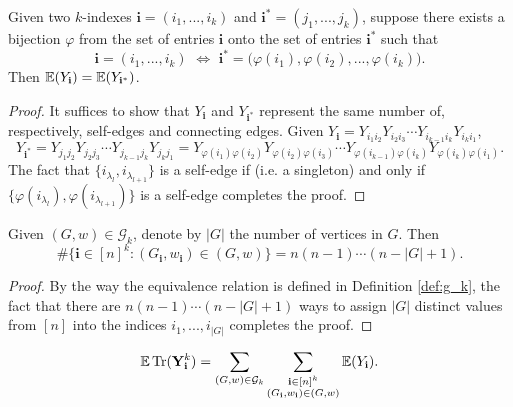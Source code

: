 \begin{lemma}
  \label{lem:equal_equiv_class_equal_expectation}
  \notready
  \uses{}
  Given two $k$-indexes $\mathbf{i} = (i_1,...,i_k)$ and $\mathbf{i}^* = (j_1,...,j_k)$, 
  suppose there exists a bijection $\varphi$ from the set of entries $\mathbf{i}$ onto the set of entries $\mathbf{i}^*$ such that
  \[
  \mathbf{i} = (i_1,...,i_k) \,\, \Longleftrightarrow \,\, \mathbf{i}^* = \bigl( \varphi(i_1),\varphi(i_2),...,\varphi(i_k) \bigl).
  \]
  Then ${\mathbb{E}} (Y_\mathbf{i}) = {\mathbb{E}} (Y_{\mathbf{i}^*})$.
\end{lemma}
\begin{proof}
  It suffices to show that $Y_\mathbf{i}$ and $Y_{\mathbf{i}^*}$ represent the same number of, respectively, self-edges and connecting edges.
  Given $Y_\mathbf{i} = Y_{i_1 i_2}Y_{i_2 i_3} \cdots Y_{i_{k-1} i_k}Y_{i_k i_1}$,
  \[
  Y_{\mathbf{i}^*} = Y_{j_1 j_2}Y_{j_2 j_3} \cdots Y_{j_{k-1} j_k}Y_{j_k j_1} 
  = Y_{\varphi(i_1) \varphi(i_2)}Y_{\varphi(i_2) \varphi(i_3)} \cdots Y_{\varphi(i_{k-1}) \varphi(i_k)}Y_{\varphi(i_k) \varphi(i_1)}.
  \] 
  The fact that $\{ i_{\lambda_l},i_{\lambda_{l+1}} \}$ is a self-edge 
  if (i.e. a singleton) and only if $\{ \varphi(i_{\lambda_l}),\varphi(i_{\lambda_{l+1}}) \}$ is a self-edge completes the proof.
\end{proof}
\begin{lemma}
  \label{lem:lem_4.3}
  Given $(G,w) \in \mathcal{G}_k$, denote by $|G|$ the number of vertices in $G$. Then
  \[
  \# \{ \mathbf{i} \in [n]^k : (G_\mathbf{i},w_\mathbf{i}) \in (G,w) \} = n (n-1) \cdots (n - |G| + 1).
  \]
\end{lemma}
\begin{proof}
  By the way the equivalence relation is defined in Definition \ref{def:g_k}, 
  the fact that there are $n (n - 1) \cdots (n -|G| + 1)$ ways to assign $|G|$ distinct values from $[n]$ into the indices $i_1,...,i_{|G|}$ completes the proof.
\end{proof}
\begin{lemma}
  \label{lem:equation_4.5_1}
  \[
  {\mathbb{E}} \operatorname{Tr} (\mathbf{Y}_\mathbf{i}^k) = \sum_{(G,w) \in \mathcal{G}_k} \sum_{\substack{\mathbf{i} \in [n]^k \\ (G_\mathbf{i},w_\mathbf{i}) \in (G,w)}} {\mathbb{E}} (Y_\mathbf{i}).
  \]
\end{lemma}
